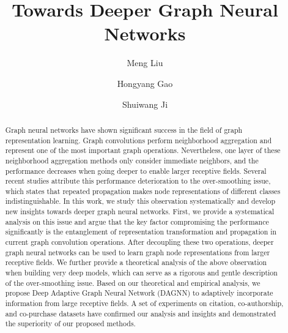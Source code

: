 \documentclass[sigconf]{acmart}
\begin{document}
\fancyhead{}
\title{Towards Deeper Graph Neural Networks}




\author{Meng Liu}

\author{Hongyang Gao}

\author{Shuiwang Ji}





\begin{abstract}



Graph neural networks have shown significant success in the field of graph representation learning. Graph convolutions perform neighborhood aggregation and represent one of the most important graph operations. Nevertheless, one layer of these neighborhood aggregation methods only consider immediate neighbors, and the performance decreases when going deeper to enable larger receptive fields. Several recent studies attribute this performance deterioration to the over-smoothing issue, which states that repeated propagation makes node representations of different classes indistinguishable. In this work, we study this observation systematically and develop new insights towards deeper graph neural networks. First, we provide a systematical analysis on this issue and argue that the key factor compromising the performance significantly is the entanglement of representation transformation and propagation in current graph convolution operations. After decoupling these two operations, deeper graph neural networks can be used to learn graph node representations from larger receptive fields. We further provide a theoretical analysis of the above observation when building very deep models, which can serve as a rigorous and gentle description of the over-smoothing issue. Based on our theoretical and empirical analysis, we propose Deep Adaptive Graph Neural Network (DAGNN) to adaptively incorporate information from large receptive fields. A set of experiments on citation, co-authorship, and co-purchase datasets have confirmed our analysis and insights and demonstrated the superiority of our proposed methods.

\end{abstract}
\end{document}
